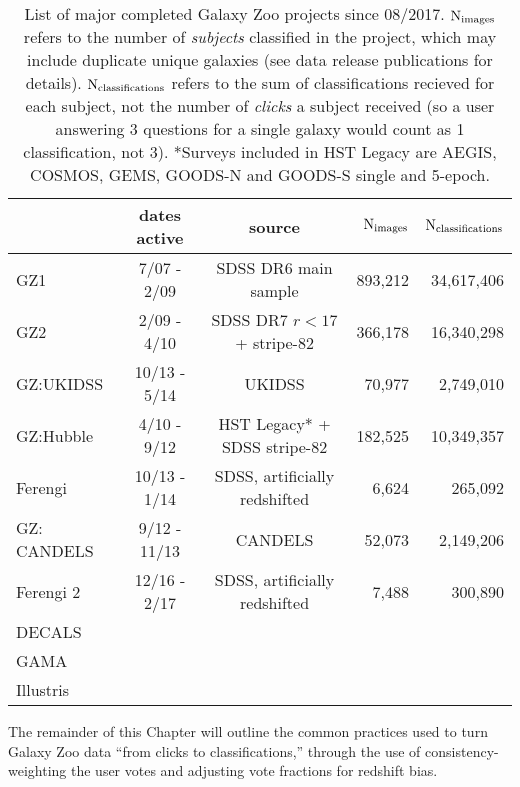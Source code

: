 \begin{table}
\rotate
\caption{List of major completed Galaxy Zoo projects since 08/2017. $\rm N_{images}$ refers to the number of \emph{subjects} classified in the project, which may include duplicate unique galaxies (see data release publications for details). $\rm N_{classifications}$ refers to the sum of classifications recieved for each subject, not the number of \emph{clicks} a subject received (so a user answering 3 questions for a single galaxy would count as 1 classification, not 3). *Surveys included in HST Legacy are AEGIS, COSMOS, GEMS, GOODS-N and GOODS-S single and 5-epoch. }\label{tab:project_summary}
\begin{tabular}{lccrr}
\hline\hline
                    & dates active &  source 			   & $\rm N_{images}$ & $\rm N_{classifications}$   \\
\hline
GZ1        	    & 7/07 - 2/09  & SDSS DR6 main sample          & 893,212 	      & 34,617,406 \\
GZ2      	    & 2/09 - 4/10  & SDSS DR7 $r < 17$ + stripe-82 & 366,178          & 16,340,298 \\
GZ:UKIDSS           & 10/13 - 5/14 & UKIDSS   			   & 70,977           & 2,749,010 \\ 
GZ:Hubble           & 4/10 - 9/12  & HST Legacy* + SDSS stripe-82  & 182,525          & 10,349,357 \\
Ferengi             & 10/13 - 1/14 & SDSS, artificially redshifted & 6,624            & 265,092 \\
GZ: CANDELS         & 9/12 - 11/13 & CANDELS   			   & 52,073           & 2,149,206 \\
Ferengi 2           & 12/16 - 2/17 & SDSS, artificially redshifted & 7,488            & 300,890 \\
DECALS              &              &				   &		      &         \\
GAMA                &              &				   &		      &		\\
Illustris           &              & 				   &		      &         \\

\hline
\hline
\end{tabular}
\end{table}


The remainder of this Chapter will outline the common practices used to turn Galaxy Zoo data ``from clicks to classifications,'' through the use of consistency-weighting the user votes and adjusting vote fractions for redshift bias. 


